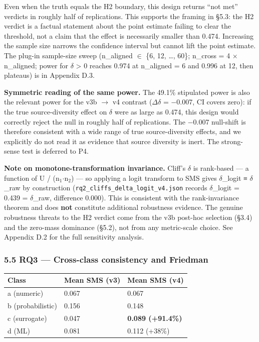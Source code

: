 \documentclass[review,12pt,authoryear]{elsarticle}
\newcounter{none}                   %
\begin{document}
Even when the truth equals the H2 boundary, this design returns ``not
met'' verdicts in roughly half of replications. This supports the
framing in §5.3: the H2 verdict is a factual statement about the point
estimate failing to clear the threshold, not a claim that the effect is
necessarily smaller than 0.474. Increasing the sample size narrows the
confidence interval but cannot lift the point estimate. The plug-in
sample-size sweep (n\_aligned $\in$ \{6, 12, \ldots, 60\}; n\_cross = 4 $\times$
n\_aligned; power for $\delta$ \textgreater{} 0 reaches 0.974 at n\_aligned = 6
and 0.996 at 12, then plateaus) is in Appendix D.3.

\textbf{Symmetric reading of the same power.} The 49.1\% stipulated
power is also the relevant power for the v3b $\to$ v4 contrast ($\Delta$$\delta$ = −0.007,
CI covers zero): if the true source-diversity effect on $\delta$ were as large
as 0.474, this design would correctly reject the null in roughly half of
replications. The −0.007 null-shift is therefore consistent with a wide
range of true source-diversity effects, and we explicitly do not read it
as evidence that source diversity is inert. The strong-sense test is
deferred to P4.

\textbf{Note on monotone-transformation invariance.} Cliff's $\delta$ is
rank-based --- a function of U / (n$_{1}$$\cdot$n$_{2}$) --- so applying a logit
transform to SMS gives $\delta$\_logit ≡ $\delta$\_raw by construction
(\texttt{rq2\_cliffs\_delta\_logit\_v4.json} records $\delta$\_logit = 0.439 =
$\delta$\_raw, difference 0.000). This is consistent with the rank-invariance
theorem and does \textbf{not} constitute additional robustness evidence.
The genuine robustness threats to the H2 verdict come from the v3b
post-hoc selection (§3.4) and the zero-mass dominance (§5.2), not from
any metric-scale choice. See Appendix D.2 for the full sensitivity
analysis.

\subsubsection{5.5 RQ3 --- Cross-class consistency and
Friedman}\label{rq3-cross-class-consistency-and-friedman}

{\def\LTcaptype{none} %
\begin{longtable}[]{@{}lll@{}}
\toprule\noalign{}
Class & Mean SMS (v3) & Mean SMS (v4) \\
\midrule\noalign{}
\endhead
\bottomrule\noalign{}
\endlastfoot
a (numeric) & 0.067 & 0.067 \\
b (probabilistic) & 0.156 & 0.148 \\
c (surrogate) & 0.047 & \textbf{0.089 (+91.4\%)} \\
d (ML) & 0.081 & 0.112 (+38\%) \\
\end{longtable}
}
\end{document}
